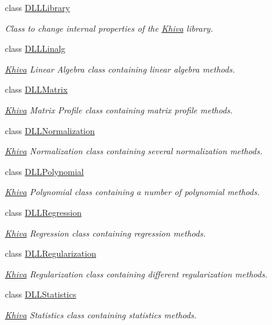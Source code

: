 \begin{DoxyCompactItemize}
class \mbox{\hyperlink{classkhiva_1_1interop_1_1_d_l_l_library}{D\+L\+L\+Library}}
\begin{DoxyCompactList}\small\item\em Class to change internal properties of the \mbox{\hyperlink{classkhiva_1_1_khiva}{Khiva}} library. \end{DoxyCompactList}\item 
class \mbox{\hyperlink{classkhiva_1_1interop_1_1_d_l_l_linalg}{D\+L\+L\+Linalg}}
\begin{DoxyCompactList}\small\item\em \mbox{\hyperlink{classkhiva_1_1_khiva}{Khiva}} Linear Algebra class containing linear algebra methods. \end{DoxyCompactList}\item 
class \mbox{\hyperlink{classkhiva_1_1interop_1_1_d_l_l_matrix}{D\+L\+L\+Matrix}}
\begin{DoxyCompactList}\small\item\em \mbox{\hyperlink{classkhiva_1_1_khiva}{Khiva}} Matrix Profile class containing matrix profile methods. \end{DoxyCompactList}\item 
class \mbox{\hyperlink{classkhiva_1_1interop_1_1_d_l_l_normalization}{D\+L\+L\+Normalization}}
\begin{DoxyCompactList}\small\item\em \mbox{\hyperlink{classkhiva_1_1_khiva}{Khiva}} Normalization class containing several normalization methods. \end{DoxyCompactList}\item 
class \mbox{\hyperlink{classkhiva_1_1interop_1_1_d_l_l_polynomial}{D\+L\+L\+Polynomial}}
\begin{DoxyCompactList}\small\item\em \mbox{\hyperlink{classkhiva_1_1_khiva}{Khiva}} Polynomial class containing a number of polynomial methods. \end{DoxyCompactList}\item 
class \mbox{\hyperlink{classkhiva_1_1interop_1_1_d_l_l_regression}{D\+L\+L\+Regression}}
\begin{DoxyCompactList}\small\item\em \mbox{\hyperlink{classkhiva_1_1_khiva}{Khiva}} Regression class containing regression methods. \end{DoxyCompactList}\item 
class \mbox{\hyperlink{classkhiva_1_1interop_1_1_d_l_l_regularization}{D\+L\+L\+Regularization}}
\begin{DoxyCompactList}\small\item\em \mbox{\hyperlink{classkhiva_1_1_khiva}{Khiva}} Regularization class containing different regularization methods. \end{DoxyCompactList}\item 
class \mbox{\hyperlink{classkhiva_1_1interop_1_1_d_l_l_statistics}{D\+L\+L\+Statistics}}
\begin{DoxyCompactList}\small\item\em \mbox{\hyperlink{classkhiva_1_1_khiva}{Khiva}} Statistics class containing statistics methods. \end{DoxyCompactList}\end{DoxyCompactItemize}
